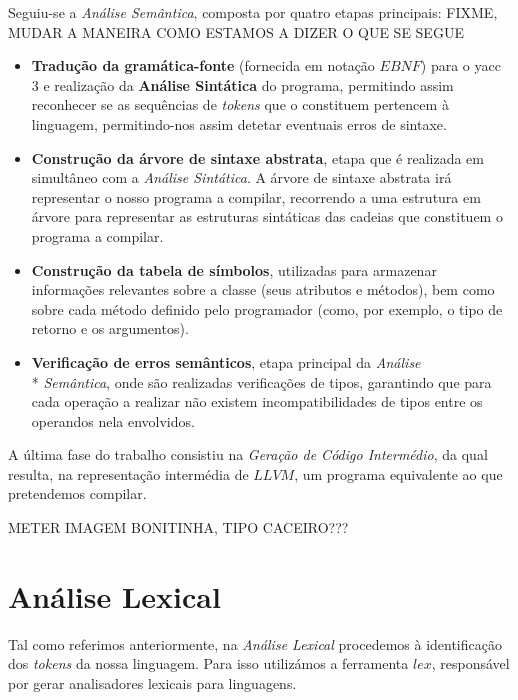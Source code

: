 \documentclass[11pt,a4paper]{article}
\begin{document}
Seguiu-se a \emph{Análise Semântica}, composta por quatro etapas principais: FIXME, MUDAR A MANEIRA COMO ESTAMOS A DIZER O QUE SE SEGUE

\begin{itemize}
\item \textbf{Tradução da gramática-fonte} (fornecida em notação $EBNF$) para o yacc 3 e realização da \textbf{Análise Sintática} do programa, permitindo assim reconhecer se as sequências de \emph{tokens} que o constituem pertencem à linguagem, permitindo-nos assim detetar eventuais erros de sintaxe.

\item \textbf{Construção da árvore de sintaxe abstrata}, etapa que é realizada em simultâneo com a \emph{Análise Sintática}. A árvore de sintaxe abstrata irá representar o nosso programa a compilar, recorrendo a uma estrutura em árvore para representar as estruturas sintáticas das cadeias que constituem o programa a compilar.

\item \textbf{Construção da tabela de símbolos}, utilizadas para armazenar informações relevantes sobre a classe (seus atributos e métodos), bem como sobre cada método definido pelo programador (como, por exemplo, o tipo de retorno e os argumentos).

\item \textbf{Verificação de erros semânticos}, etapa principal da \emph{Análise} \\* \emph{Semântica}, onde são realizadas verificações de tipos, garantindo que para cada operação a realizar não existem incompatibilidades de tipos entre os operandos nela envolvidos.

\end{itemize}

A última fase do trabalho consistiu na \emph{Geração de Código Intermédio}, da qual resulta, na representação intermédia de $LLVM$, um programa equivalente ao que pretendemos compilar.

METER IMAGEM BONITINHA, TIPO CACEIRO???

\pagebreak

\section{Análise Lexical}

Tal como referimos anteriormente, na \emph{Análise Lexical} procedemos à identificação dos \emph{tokens} da nossa linguagem. Para isso utilizámos a ferramenta $lex$, responsável por gerar analisadores lexicais para linguagens.
\end{document}
